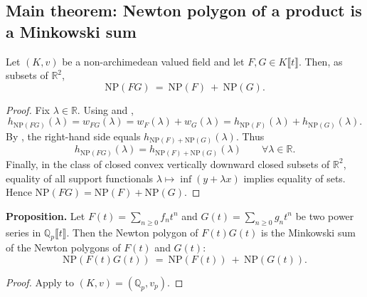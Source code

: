 \subsection{Main theorem: Newton polygon of a product is a Minkowski sum}

\begin{theorem}
  \label{thm:newton_polygon_mul}
  \leanok
  Let $(K,v)$ be a non-archimedean valued field and let $F,G\in K\llbracket t\rrbracket$.
  Then, as subsets of $\mathbb{R}^2$,
  \[
    \mathrm{NP}(FG)\ =\ \mathrm{NP}(F)\ +\ \mathrm{NP}(G).
  \]
\end{theorem}

\begin{proof}
  \leanok
  Fix $\lambda\in\mathbb{R}$.
  Using  and ,
  \[
    h_{\mathrm{NP}(FG)}(\lambda)=w_{FG}(\lambda)=w_F(\lambda)+w_G(\lambda)
    =h_{\mathrm{NP}(F)}(\lambda)+h_{\mathrm{NP}(G)}(\lambda).
  \]
  By , the right-hand side equals $h_{\mathrm{NP}(F)+\mathrm{NP}(G)}(\lambda)$.
  Thus
  \[
    h_{\mathrm{NP}(FG)}(\lambda)=h_{\mathrm{NP}(F)+\mathrm{NP}(G)}(\lambda)\qquad \forall \lambda\in\mathbb{R}.
  \]
  Finally, in the class of closed convex vertically downward closed subsets of $\mathbb{R}^2$,
  equality of all support functionals $\lambda\mapsto \inf(y+\lambda x)$ implies equality of sets.
  Hence $\mathrm{NP}(FG)=\mathrm{NP}(F)+\mathrm{NP}(G)$.
\end{proof}

\begin{theorem}
  \label{thm:newton_polygon_mul_Qp}
  \leanok
  \textbf{Proposition.}
  Let $F(t) = \sum_{n \geq 0} f_n t^n$ and $G(t) = \sum_{n \geq 0} g_n t^n$ be two power series in $\mathbb{Q}_p\llbracket t\rrbracket$.
  Then the Newton polygon of $F(t)G(t)$ is the Minkowski sum of the Newton polygons of $F(t)$ and $G(t)$:
  \[
    \mathrm{NP}(F(t)G(t))\ =\ \mathrm{NP}(F(t))\ +\ \mathrm{NP}(G(t)).
  \]
\end{theorem}

\begin{proof}
  \leanok
  Apply  to $(K,v)=(\mathbb{Q}_p,v_p)$.
\end{proof}

